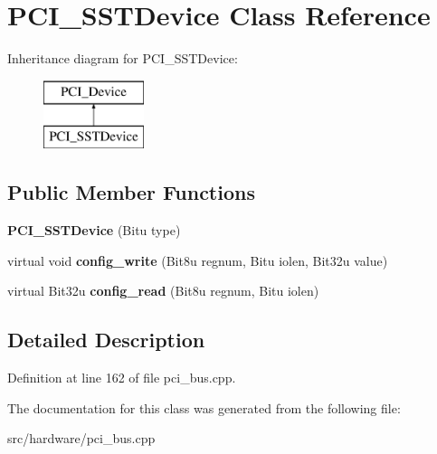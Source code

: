 \hypertarget{classPCI__SSTDevice}{\section{P\-C\-I\-\_\-\-S\-S\-T\-Device Class Reference}
\label{classPCI__SSTDevice}
}
Inheritance diagram for P\-C\-I\-\_\-\-S\-S\-T\-Device\-:\begin{figure}[H]
\begin{center}
\leavevmode
\includegraphics[height=2.000000cm]{classPCI__SSTDevice}
\end{center}
\end{figure}
\subsection*{Public Member Functions}
\begin{DoxyCompactItemize}
\item 
\hypertarget{classPCI__SSTDevice_a54b4296972afb04dbae524134bd15ddd}{{\bfseries P\-C\-I\-\_\-\-S\-S\-T\-Device} (Bitu type)}\label{classPCI__SSTDevice_a54b4296972afb04dbae524134bd15ddd}

\item 
\hypertarget{classPCI__SSTDevice_a10b8507ff365b24457f76327b9a66cc8}{virtual void {\bfseries config\-\_\-write} (Bit8u regnum, Bitu iolen, Bit32u value)}\label{classPCI__SSTDevice_a10b8507ff365b24457f76327b9a66cc8}

\item 
\hypertarget{classPCI__SSTDevice_a6f5475387ebdf2f3baa4db69b8ccd992}{virtual Bit32u {\bfseries config\-\_\-read} (Bit8u regnum, Bitu iolen)}\label{classPCI__SSTDevice_a6f5475387ebdf2f3baa4db69b8ccd992}

\end{DoxyCompactItemize}


\subsection{Detailed Description}


Definition at line 162 of file pci\-\_\-bus.\-cpp.



The documentation for this class was generated from the following file\-:\begin{DoxyCompactItemize}
\item 
src/hardware/pci\-\_\-bus.\-cpp\end{DoxyCompactItemize}
